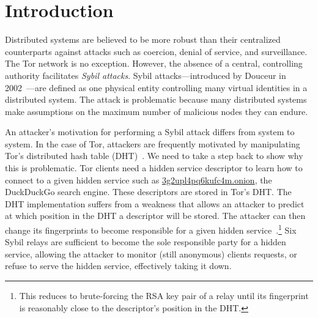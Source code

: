 \section{Introduction}
\label{sec:introduction}

Distributed systems are believed to be more robust than their centralized
counterparts against attacks such as coercion, denial of service, and
surveillance.  The Tor network is no exception. 
However, the absence of a central, controlling authority facilitates
\emph{Sybil attacks}.  Sybil attacks---introduced by Douceur in
2002~\cite{Douceur2002a}---are defined as one physical entity controlling many
virtual identities in a distributed system.  The attack is problematic because
many distributed systems make assumptions on the maximum number of malicious
nodes they can endure.

An attacker's motivation for performing a Sybil attack differs from system to
system.  In the case of Tor, attackers are frequently motivated by manipulating
Tor's distributed hash table (DHT)~\cite{rendspec}.  We need to take a step back
to show why this is problematic.  Tor clients need a hidden service
descriptor to learn how to connect to a given hidden service such as
\url{3g2upl4pq6kufc4m.onion}, the DuckDuckGo search engine.  These descriptors
are stored in Tor's DHT.  The DHT implementation suffers from a weakness that
allows an attacker to predict at which position in the DHT a descriptor will be
stored.  The attacker can then change its fingerprints to become responsible
for a given hidden service~\cite{Biryukov2013a}.\footnote{This reduces to
brute-forcing the RSA key pair of a relay until its fingerprint is reasonably
close to the descriptor's position in the DHT.}  Six Sybil relays are
sufficient to become the sole responsible party for a hidden service, allowing
the attacker to monitor (still anonymous) clients requests, or refuse to serve
the hidden service, effectively taking it down.

